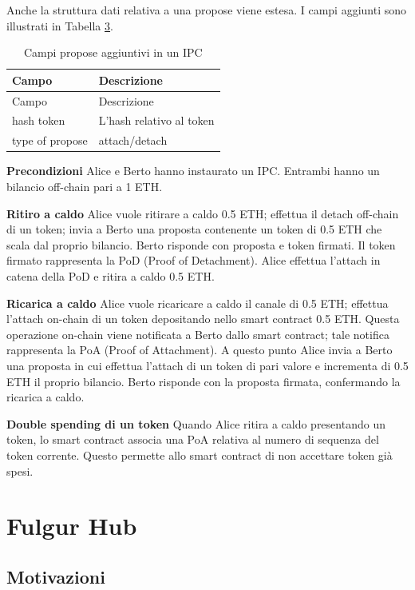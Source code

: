 \documentclass[12pt,italian,]{book}
\begin{document}
Anche la struttura dati relativa a una propose viene estesa. I campi aggiunti sono illustrati in Tabella \protect\hyperlink{propose_estesa}{3}.

\begin{longtable}[]{@{}ll@{}}
\caption{\protect\hypertarget{propose_estesa}{}{}Campi propose aggiuntivi in un IPC}\tabularnewline
\toprule
Campo & Descrizione\tabularnewline
\midrule
\endfirsthead
\toprule
Campo & Descrizione\tabularnewline
\midrule
\endhead
hash token & L'hash relativo al token\tabularnewline
type of propose & attach/detach\tabularnewline
\bottomrule
\end{longtable}

\textbf{\textbf{Precondizioni}} Alice e Berto hanno instaurato un IPC. Entrambi hanno un bilancio off-chain pari a 1 ETH.

\textbf{\textbf{Ritiro a caldo}} Alice vuole ritirare a caldo 0.5 ETH; effettua il detach off-chain di un token; invia a Berto una proposta contenente un token di 0.5 ETH che scala dal proprio bilancio. Berto risponde con proposta e token firmati. Il token firmato rappresenta la PoD (Proof of Detachment). Alice effettua l'attach in catena della PoD e ritira a caldo 0.5 ETH.

\textbf{\textbf{Ricarica a caldo}} Alice vuole ricaricare a caldo il canale di 0.5 ETH; effettua l'attach on-chain di un token depositando nello smart contract 0.5 ETH. Questa operazione on-chain viene notificata a Berto dallo smart contract; tale notifica rappresenta la PoA (Proof of Attachment). A questo punto Alice invia a Berto una proposta in cui effettua l'attach di un token di pari valore e incrementa di 0.5 ETH il proprio bilancio. Berto risponde con la proposta firmata, confermando la ricarica a caldo.

\textbf{\textbf{Double spending di un token}} Quando Alice ritira a caldo presentando un token, lo smart contract associa una PoA relativa al numero di sequenza del token corrente. Questo permette allo smart contract di non accettare token già spesi.

\hypertarget{fulgur-hub}{%
\section{Fulgur Hub}\label{fulgur-hub}}

\hypertarget{motivazioni}{%
\subsection{Motivazioni}\label{motivazioni}}
\end{document}
